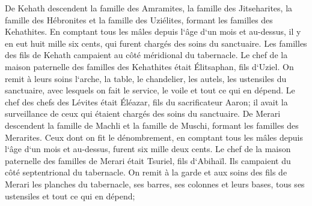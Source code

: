 \verse De Kehath descendent la famille des Amramites, la famille des Jitseharites, la famille des Hébronites et la famille des Uziélites, formant les familles des Kehathites. 
\verse En comptant tous les mâles depuis l`âge d`un mois et au-dessus, il y en eut huit mille six cents, qui furent chargés des soins du sanctuaire. 
\verse Les familles des fils de Kehath campaient au côté méridional du tabernacle. 
\verse Le chef de la maison paternelle des familles des Kehathites était Élitsaphan, fils d`Uziel. 
\verse On remit à leurs soins l`arche, la table, le chandelier, les autels, les ustensiles du sanctuaire, avec lesquels on fait le service, le voile et tout ce qui en dépend. 
\verse Le chef des chefs des Lévites était Éléazar, fils du sacrificateur Aaron; il avait la surveillance de ceux qui étaient chargés des soins du sanctuaire. 
\verse De Merari descendent la famille de Machli et la famille de Muschi, formant les familles des Merarites. 
\verse Ceux dont on fit le dénombrement, en comptant tous les mâles depuis l`âge d`un mois et au-dessus, furent six mille deux cents. 
\verse Le chef de la maison paternelle des familles de Merari était Tsuriel, fils d`Abihaïl. Ils campaient du côté septentrional du tabernacle. 
\verse On remit à la garde et aux soins des fils de Merari les planches du tabernacle, ses barres, ses colonnes et leurs bases, tous ses ustensiles et tout ce qui en dépend; 
